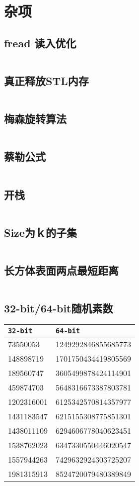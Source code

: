 \section{杂项}
\subsection{fread 读入优化}
\inputminted[breaklines]{cpp}{./hint/input-acceleration.cpp}
\subsection{真正释放STL内存}
\inputminted[breaklines]{cpp}{./hint/STL-memory-release.cpp}
\subsection{梅森旋转算法}
\inputminted[breaklines]{cpp}{./hint/mersenne-twister.cpp}
\subsection{蔡勒公式}
\inputminted[breaklines]{cpp}{./hint/zeller.cpp}
\subsection{开栈}
\inputminted[breaklines]{cpp}{./hint/openstack.cpp}
\subsection{Size为ｋ的子集}
\inputminted[breaklines]{cpp}{./hint/subset-of-size-k.cpp}
\subsection{长方体表面两点最短距离}
\inputminted[breaklines]{cpp}{./hint/distance-on-surface-of-cuboid.cpp}
\subsection{32-bit/64-bit随机素数}
\begin{tabular}{|l|l|}
	\hline
	\texttt{32-bit} & \texttt{64-bit} \\
	\hline
	73550053 & 1249292846855685773 \\
	\hline
	148898719 & 1701750434419805569 \\
	\hline
	189560747 & 3605499878424114901 \\
	\hline
	459874703 & 5648316673387803781 \\
	\hline
	1202316001 & 6125342570814357977 \\
	\hline
	1431183547 & 6215155308775851301 \\
	\hline
	1438011109 & 6294606778040623451 \\
	\hline
	1538762023 & 6347330550446020547 \\
	\hline
	1557944263 & 7429632924303725207 \\
	\hline
	1981315913 & 8524720079480389849 \\
	\hline
\end{tabular}


